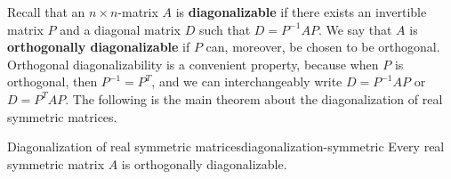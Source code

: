 Recall that an $n\times n$-matrix $A$ is \textbf{diagonalizable}%
%
 if there exists an invertible matrix $P$
and a diagonal matrix $D$ such that $D = P^{-1}AP$. We say that $A$ is
\textbf{orthogonally diagonalizable}%
%
%
%
%
 if $P$ can, moreover, be
chosen to be orthogonal. Orthogonal diagonalizability is a convenient
property, because when $P$ is orthogonal, then $P^{-1}=P^T$, and we
can interchangeably write $D = P^{-1}AP$ or $D = P^TAP$.  The
following is the main theorem about the diagonalization of real
symmetric matrices.

\begin{theorem}{Diagonalization of real symmetric matrices}{diagonalization-symmetric}
  Every real symmetric matrix $A$ is orthogonally diagonalizable.
\end{theorem}

